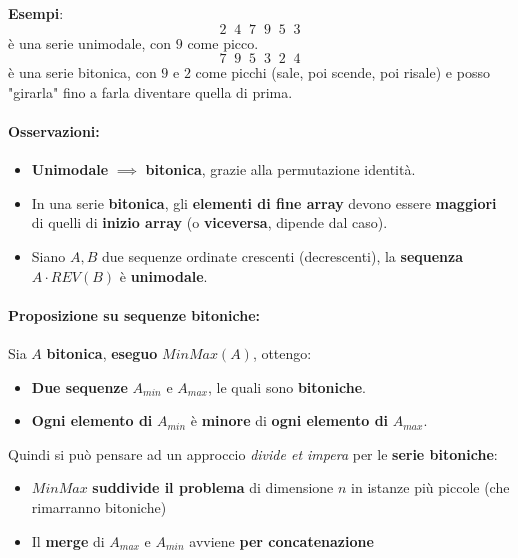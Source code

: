\newpage

\textbf{Esempi}: 
$$ 2 \;\; 4 \;\; 7 \;\; 9 \;\; 5 \;\; 3 $$
è una serie unimodale, con $9$ come picco.\\

$$ 7 \;\; 9 \;\; 5 \;\; 3 \;\; 2 \;\; 4 $$
è una serie bitonica, con $9$ e $2$ come picchi (sale, poi scende, poi risale) e posso "girarla" fino a farla diventare quella di prima.\\


\paragraph{Osservazioni: }
\begin{itemize}
	\item \textbf{Unimodale} $\implies$ \textbf{bitonica}, grazie alla permutazione identità.\\
	
	\item In una serie \textbf{bitonica}, gli \textbf{elementi di fine array} devono essere \textbf{maggiori} di quelli di \textbf{inizio array} (o \textbf{viceversa}, dipende dal caso).\\
	
	\item Siano $A,B$ due sequenze ordinate crescenti (decrescenti), la \textbf{sequenza} $A \cdot REV(B)$ è \textbf{unimodale}.\\
\end{itemize}


\paragraph{Proposizione su sequenze bitoniche:} Sia $A$ \textbf{bitonica}, \textbf{eseguo} $MinMax(A)$, ottengo:
\begin{itemize}
	\item \textbf{Due sequenze} $A_{min}$ e $A_{max}$, le quali sono \textbf{bitoniche}.\\
	
	\item \textbf{Ogni elemento di} $A_{min}$ è \textbf{minore} di \textbf{ogni elemento di} $A_{max}$.\\
\end{itemize}


Quindi si può pensare ad un approccio \textit{divide et impera} per le \textbf{serie bitoniche}:
\begin{itemize}
	\item $MinMax$ \textbf{suddivide il problema} di dimensione $n$ in istanze più piccole (che rimarranno bitoniche)
	
	\item Il \textbf{merge} di $A_{max}$ e $A_{min}$ avviene \textbf{per concatenazione}
\end{itemize}

